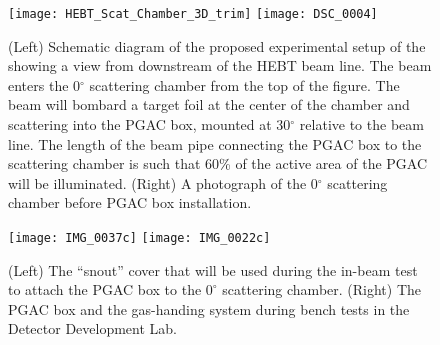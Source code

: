 \begin{figure}[ht]
\centering
\texttt{[image: HEBT\_Scat\_Chamber\_3D\_trim]}\hspace{\fill}
\texttt{[image: DSC\_0004]} \hspace{\fill}
\caption{(Left) Schematic diagram of the proposed experimental setup of the 
showing a view from downstream of the HEBT beam line.  The beam enters the 0$^\circ$ scattering chamber from the top of the figure.  The beam will bombard a target foil at the center of the chamber and scattering into the PGAC box, mounted at 30$^\circ$ relative to the beam line.  The length of the beam pipe connecting the PGAC box to the scattering chamber is such that 60\% of the active area of the PGAC will be illuminated.  (Right) A photograph of the 0$^\circ$ scattering chamber before PGAC box installation.
}
\label{schematic}
\end{figure}
\begin{figure}[ht]%
\centering
\hspace{\fill}
\texttt{[image: IMG\_0037c]} \hspace{\fill}
\texttt{[image: IMG\_0022c]} \hspace{\fill}
\caption{(Left) The ``snout'' cover that will be used during the in-beam test to attach the PGAC box to the $0^\circ$ scattering chamber. (Right) The PGAC box and the gas-handing system during bench tests in the Detector Development Lab.}%
\label{photos}%
\end{figure}


